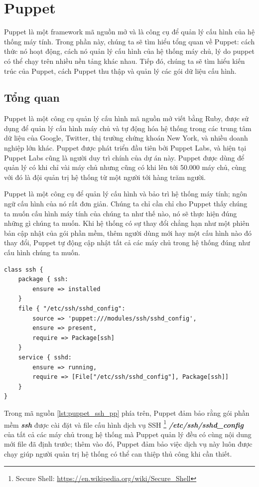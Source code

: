 \section{Puppet}
Puppet là một framework mã nguồn mở và là công cụ để quản lý cấu hình của hệ thống máy tính. Trong phần này, chúng ta sẽ tìm hiểu tổng quan về Puppet: cách thức nó hoạt động, cách nó quản lý cấu hình của hệ thống máy chủ, lý do puppet có thể chạy trên nhiều nền tảng khác nhau. Tiếp đó, chúng ta sẽ tìm hiểu kiến trúc của Puppet, cách Puppet thu thập và quản lý các gói dữ liệu cấu hình.

\subsection{Tổng quan}
Puppet là một công cụ quản lý cấu hình mã nguồn mở viết bằng Ruby, được sử dụng để quản lý cấu hình máy chủ và tự động hóa hệ thống trong các trung tâm dữ liệu của Google, Twitter, thị trường chứng khoán New York, và nhiều doanh nghiệp lớn khác. Puppet được phát triển đầu tiên bởi Puppet Labs, và hiện tại Puppet Labs cũng là người duy trì chính của dự án này. Puppet được dùng để quản lý có khi chỉ vài máy chủ nhưng cũng có khi lên tới 50.000 máy chủ, cùng với đó là đội quản trị hệ thống từ một người tới hàng trăm người.

Puppet là một công cụ để quản lý cấu hình và bảo trì hệ thống máy tính; ngôn ngữ cấu hình của nó rất đơn giản. Chúng ta chỉ cần chỉ cho Puppet thấy chúng ta muốn cấu hình máy tính của chúng ta như thế nào, nó sẽ thực hiện đúng những gì chúng ta muốn. Khi hệ thống có sự thay đổi chẳng hạn như một phiên bản cập nhật của gói phần mềm, thêm người dùng mới hay một cấu hình nào đó thay đổi, Puppet tự động cập nhật tất cả các máy chủ trong hệ thống đúng như cấu hình chúng ta muốn.

\newpage
\clearpage

\begin{lstlisting}[label={lst:puppet_ssh_pp},caption={Ví dụ về ngôn ngữ cấu hình của Puppet},morekeywords={class, package, file, source, ensure, require, service, File, Package}]
class ssh {
    package { ssh:
        ensure => installed
    }
    file { "/etc/ssh/sshd_config":
        source => 'puppet:///modules/ssh/sshd_config',
        ensure => present,
        require => Package[ssh]
    }
    service { sshd:
        ensure => running,
        require => [File["/etc/ssh/sshd_config"], Package[ssh]]
    }
}
\end{lstlisting}


Trong mã nguồn \ref{lst:puppet_ssh_pp} phía trên, Puppet đảm bảo rằng gói phần mềm \textbf{\textit{ssh}} được cài đặt và file cấu hình dịch vụ SSH \footnote{Secure Shell: \url{https://en.wikipedia.org/wiki/Secure_Shell}} \textbf{\textit{/etc/ssh/sshd\_config}} của tất cả các máy chủ trong hệ thống mà Puppet quản lý đều có cùng nội dung mới file đã định trước; thêm vào đó, Puppet đảm bảo việc dịch vụ này luôn được chạy giúp người quản trị hệ thống có thể can thiệp thủ công khi cần thiết.

